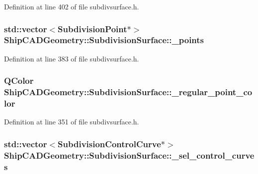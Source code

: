 Definition at line 402 of file subdivsurface.\-h.

\hypertarget{classShipCADGeometry_1_1SubdivisionSurface_aee8defd15695208cd384c7e384b3525e}{
\subsubsection[{\-\_\-points}]{\setlength{\rightskip}{0pt plus 5cm}std\-::vector$<${\bf Subdivision\-Point}$\ast$$>$ Ship\-C\-A\-D\-Geometry\-::\-Subdivision\-Surface\-::\-\_\-points\hspace{0.3cm}{\ttfamily [protected]}}}\label{classShipCADGeometry_1_1SubdivisionSurface_aee8defd15695208cd384c7e384b3525e}


Definition at line 383 of file subdivsurface.\-h.

\hypertarget{classShipCADGeometry_1_1SubdivisionSurface_a0f77d9f2a48f9fe4569508d2dac00325}{
\subsubsection[{\-\_\-regular\-\_\-point\-\_\-color}]{\setlength{\rightskip}{0pt plus 5cm}Q\-Color Ship\-C\-A\-D\-Geometry\-::\-Subdivision\-Surface\-::\-\_\-regular\-\_\-point\-\_\-color\hspace{0.3cm}{\ttfamily [protected]}}}\label{classShipCADGeometry_1_1SubdivisionSurface_a0f77d9f2a48f9fe4569508d2dac00325}


Definition at line 351 of file subdivsurface.\-h.

\hypertarget{classShipCADGeometry_1_1SubdivisionSurface_ad707edb71feec99421107e9664e393be}{
\subsubsection[{\-\_\-sel\-\_\-control\-\_\-curves}]{\setlength{\rightskip}{0pt plus 5cm}std\-::vector$<${\bf Subdivision\-Control\-Curve}$\ast$$>$ Ship\-C\-A\-D\-Geometry\-::\-Subdivision\-Surface\-::\-\_\-sel\-\_\-control\-\_\-curves\hspace{0.3cm}{\ttfamily [protected]}}}\label{classShipCADGeometry_1_1SubdivisionSurface_ad707edb71feec99421107e9664e393be}


